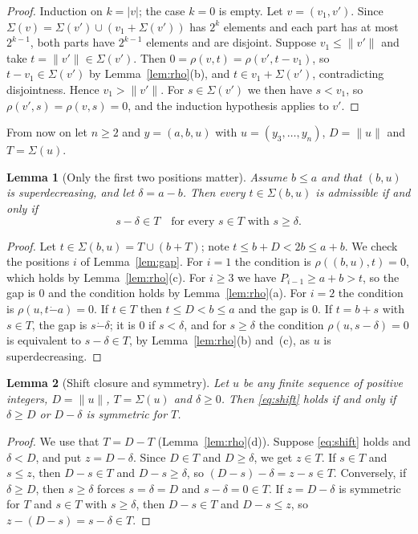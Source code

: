 \documentclass[11pt]{article}
\newtheorem{lemma}{Lemma}
\theoremstyle{remark}
\newcommand{\Sub}{\Sigma}
\newcommand{\monus}{\mathbin{\dot{-}}}
\begin{document}
\begin{proof}
Induction on $k=|v|$; the case $k=0$ is empty. Let $v=(v_1,v')$. Since
$\Sub(v)=\Sub(v')\cup(v_1+\Sub(v'))$ has $2^k$ elements and each part has at
most $2^{k-1}$, both parts have $2^{k-1}$ elements and are disjoint. Suppose
$v_1\le\|v'\|$ and take $t=\|v'\|\in\Sub(v')$. Then
$0=\rho(v,t)=\rho(v',t-v_1)$, so $t-v_1\in\Sub(v')$ by
Lemma~\ref{lem:rho}(b), and $t\in v_1+\Sub(v')$, contradicting disjointness.
Hence $v_1>\|v'\|$. For $s\in\Sub(v')$ we then have $s<v_1$, so
$\rho(v',s)=\rho(v,s)=0$, and the induction hypothesis applies to $v'$.
\end{proof}

From now on let $n\ge2$ and $y=(a,b,u)$ with $u=(y_3,\dots,y_n)$, $D=\|u\|$
and $T=\Sub(u)$.

\begin{lemma}[Only the first two positions matter]\label{lem:shift}
Assume $b\le a$ and that $(b,u)$ is superdecreasing, and let $\delta=a-b$.
Then every $t\in\Sub(b,u)$ is admissible if and only if
\begin{equation}\label{eq:shift}
s-\delta\in T\quad\text{for every }s\in T\text{ with }s\ge\delta .
\end{equation}
\end{lemma}

\begin{proof}
Let $t\in\Sub(b,u)=T\cup(b+T)$; note $t\le b+D<2b\le a+b$. We check the
positions $i$ of Lemma~\ref{lem:gap}. For $i=1$ the condition is
$\rho((b,u),t)=0$, which holds by Lemma~\ref{lem:rho}(c). For $i\ge3$ we have
$P_{i-1}\ge a+b>t$, so the gap is $0$ and the condition holds by
Lemma~\ref{lem:rho}(a). For $i=2$ the condition is $\rho(u,t\monus a)=0$. If
$t\in T$ then $t\le D<b\le a$ and the gap is $0$. If $t=b+s$ with $s\in T$,
the gap is $s\monus\delta$; it is $0$ if $s<\delta$, and for $s\ge\delta$ the
condition $\rho(u,s-\delta)=0$ is equivalent to $s-\delta\in T$, by
Lemma~\ref{lem:rho}(b) and~(c), as $u$ is superdecreasing.
\end{proof}

\begin{lemma}[Shift closure and symmetry]\label{lem:prefix}
Let $u$ be any finite sequence of positive integers, $D=\|u\|$, $T=\Sub(u)$
and $\delta\ge0$. Then \eqref{eq:shift} holds if and only if $\delta\ge D$ or
$D-\delta$ is symmetric for $T$.
\end{lemma}

\begin{proof}
We use that $T=D-T$ (Lemma~\ref{lem:rho}(d)). Suppose \eqref{eq:shift} holds
and $\delta<D$, and put $z=D-\delta$. Since $D\in T$ and $D\ge\delta$, we get
$z\in T$. If $s\in T$ and $s\le z$, then $D-s\in T$ and $D-s\ge\delta$, so
$(D-s)-\delta=z-s\in T$. Conversely, if $\delta\ge D$, then $s\ge\delta$ forces
$s=\delta=D$ and $s-\delta=0\in T$. If $z=D-\delta$ is symmetric for $T$ and
$s\in T$ with $s\ge\delta$, then $D-s\in T$ and $D-s\le z$, so
$z-(D-s)=s-\delta\in T$.
\end{proof}
\end{document}
